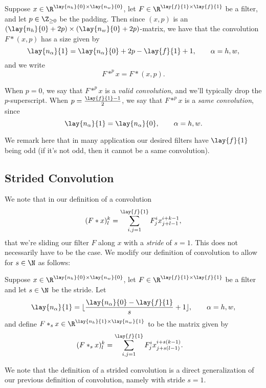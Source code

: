 Suppose $x\in\R^{\lay{n_h}{0}\times \lay{n_w}{0}}$, let $F\in\R^{\lay{f}{1}\times\lay{f}{1}}$ be a filter, and let $p\in\Z_{\geq0}$ be the padding.  Then since $(x,p)$ is an $(\lay{n_h}{0}+2p)\times(\lay{n_w}{0}+2p)$-matrix, we have that the convolution $F*(x,p)$ has a size given by
$$\lay{n_\alpha}{1}=\lay{n_\alpha}{0}+2p-\lay{f}{1}+1,\qquad \alpha=h,w,$$
and we write
$$F*^px=F*(x,p).$$

When $p=0$, we say that $F*^px$ is a \textit{valid convolution}, and we'll typically drop the $p$-superscript.  When $p=\frac{\lay{f}{1}-1}{2}$, we say that $F*^px$ is a \textit{same convolution}, since
$$\lay{n_\alpha}{1}=\lay{n_\alpha}{0},\qquad\alpha=h,w.$$

We remark here that in many application our desired filters have $\lay{f}{1}$ being odd (if it's not odd, then it cannot be a same convolution).



\subsection{Strided Convolution}

We note that in our definition of a convolution
$$(F*x)^k_l=\sum_{i,j=1}^{\lay{f}{1}}F^i_jx^{i+k-1}_{j+l-1},$$
that we're sliding our filter $F$ along $x$ with a \textit{stride} of $s=1$.  This does not necessarily have to be the case.  We modify our definition of convolution to allow for $s\in\N$ as follows:

Suppose $x\in\R^{\lay{n_h}{0}\times \lay{n_w}{0}}$, let $F\in\R^{\lay{f}{1}\times\lay{f}{1}}$ be a filter and let $s\in\N$ be the stride.   Let
$$\lay{n_\alpha}{1}=\lfloor\frac{\lay{n_\alpha}{0}-\lay{f}{1}}{s}+1\rfloor,\qquad \alpha=h,w,$$
and define $F*_sx\in\R^{\lay{n_h}{1}\times\lay{n_w}{1}}$ to be the matrix given by
\begin{align*}
	(F*_sx)^k_l&=\sum_{i,j=1}^{\lay{f}{1}}F^i_jx^{i+s(k-1)}_{j+s(l-1)}.
\end{align*}

We note that the definition of a strided convolution is a direct generalization of our previous definition of convolution, namely with stride $s=1$.



